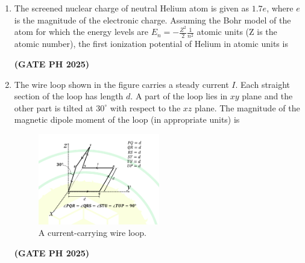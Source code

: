 \documentclass[14pt, a4paper]{extarticle}
\begin{document}
\begin{enumerate}[label=\textbf{Q.\arabic*}]

\item The screened nuclear charge of neutral Helium atom is given as $1.7e$, where $e$ is the magnitude of the electronic charge. Assuming the Bohr model of the atom for which the energy levels are $E_n = -\frac{Z^2}{2}\frac{1}{n^2}$ atomic units (Z is the atomic number), the first ionization potential of Helium in atomic units is
\begin{enumerate}
\end{enumerate}
\hfill \textbf{(GATE PH 2025)}

\item The wire loop shown in the figure carries a steady current $I$. Each straight section of the loop has length $d$. A part of the loop lies in $xy$ plane and the other part is tilted at $30^{\circ}$ with respect to the $xz$ plane. The magnitude of the magnetic dipole moment of the loop (in appropriate units) is
\begin{figure}[H]
\centering
\includegraphics[width=0.5\textwidth]{figs/q37fig25.png}
\caption{A current-carrying wire loop.}
\label{fig:q37_wire_loop}
\end{figure}
\begin{enumerate}
\end{enumerate}
\hfill \textbf{(GATE PH 2025)}


\end{enumerate}
\end{document}
